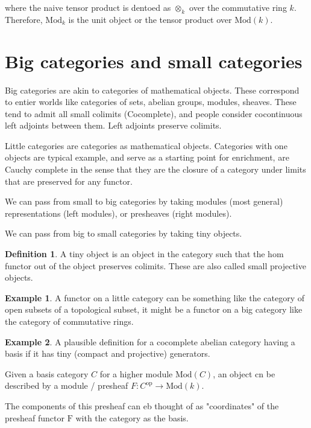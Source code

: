 \documentclass[10pt]{article}
\theoremstyle{plain}%
\theoremstyle{definition}
\newtheorem{definition}{Definition}[section]
\newtheorem{example}{Example}[section]
\theoremstyle{remark}
\begin{document}
where the naive tensor product is dentoed as $\otimes_k$ over the commutative ring $k$. Therefore, $\mathrm{Mod}_k$ is the unit object or the tensor product over $\mathrm{Mod}(k)$.

\section{Big categories and small categories}

Big categories are akin to categories of mathematical objects. These correspond to entier worlds like categories of sets, abelian groups, modules, sheaves. These tend to admit all small colimits (Cocomplete), and people consider cocontinuous left adjoints between them. Left adjoints preserve colimits.

Little categories are categories as mathematical objects. Categories with one objects are typical example, and serve as a starting point for enrichment, are Cauchy complete in the sense that they are the closure of a category under limits that are preserved for any functor.

We can pass from small to big categories by taking modules (most general) representations (left modules), or presheaves (right modules). 

We can pass from big to small categories by taking tiny objects.

\begin{definition}
	A tiny object is an object in the category such that the hom functor out of the object preserves colimits. These are also called small projective objects.
\end{definition}

\begin{example}
	A functor on a little category can be something like the category of open subsets of a topological subset, it might be a functor on a big category like the category of commutative rings.
\end{example}

\begin{example}
	A plausible definition for a cocomplete abelian category having a basis if it has tiny (compact and projective) generators.
\end{example}

Given a basis category $C$ for a higher module $\mathrm{Mod}(C)$, an object cn be described by a module / presheaf $F : C^\mathrm{op} \rightarrow \mathrm{Mod}(k)$.

The components of this presheaf can eb thought of as "coordinates" of the presheaf functor $\mathrm{F}$ with the category as the basis.
\end{document}
